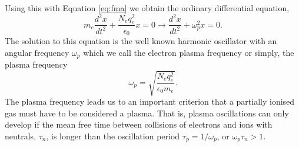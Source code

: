 Using this with Equation \ref{eq:fma} we obtain the ordinary differential equation,
\begin{equation}
\label{plasma_motion}
m_e \frac{d^2 x}{dt^2} + \frac{N_e q_e^2}{\epsilon_0} x = 0 \rightarrow \frac{d^2 x}{dt^2} + \omega_p^2 x = 0.
\end{equation}
The solution to this equation is the well known harmonic oscillator with an angular frequency $\omega_p$ which we call the electron plasma frequency or simply, the plasma frequency
\begin{equation}
\label{eq:plasma_freq}
\omega_p = \sqrt{\frac{N_e q_e^2}{\epsilon_0 m_e}}.
\end{equation}
The plasma frequency leads us to an important criterion that a partially ionised gas must have to be considered a plasma. That is, plasma oscillations can only develop if the mean free time between collisions of electrons and ions with neutrals, $\tau_n$, is longer than the oscillation period $\tau_p = 1/ \omega_p$, or $\omega_p \tau_n >1$.

